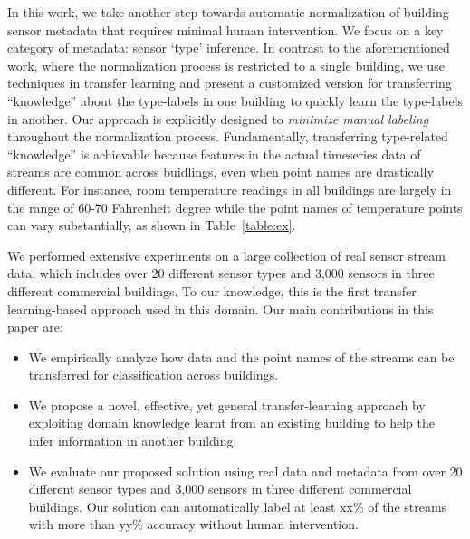 In this work, we take another step towards automatic normalization of building 
sensor metadata that requires minimal human intervention. We focus on a key category 
of metadata: sensor `type' inference. In contrast to the aforementioned work, 
where the normalization process is restricted to a single building, 
we use techniques in transfer learning and present a customized version for transferring 
``knowledge'' about the type-labels in one building to quickly learn the type-labels in another.
Our approach is explicitly designed to \emph{minimize manual labeling} throughout the normalization process.
Fundamentally, transferring type-related ``knowledge'' is achievable because
features in the actual timeseries data of streams are common 
across buidlings, even when point names are drastically different. For instance, room temperature 
readings in all buildings are largely in the range of 60-70 Fahrenheit degree while 
the point names of temperature points can vary substantially, as shown in
Table~\ref{table:ex}.

We performed extensive experiments on a large 
collection of real sensor stream data, which includes over 20 different sensor types 
and 3,000 sensors in three different commercial buildings. To our knowledge, this is the first 
transfer learning-based approach used in this domain.  Our main 
contributions in this paper are:

\begin{itemize}\itemsep1pt \parskip1pt 
\item We empirically analyze how data and the point names of the streams can be transferred for classification across buildings.
\item We propose a novel, effective, yet general transfer-learning approach by exploiting domain knowledge learnt from an existing building to help the infer information in another building.
\item We evaluate our proposed solution using real data and metadata from over 20 different sensor types and 3,000 sensors in three different commercial buildings.  Our solution can automatically label at least xx\% of the streams with more than yy\% accuracy without human intervention.
\end{itemize}
